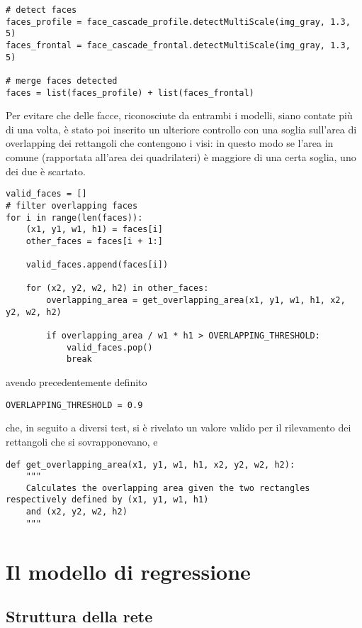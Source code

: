 \begin{verbatim}
# detect faces
faces_profile = face_cascade_profile.detectMultiScale(img_gray, 1.3, 5)
faces_frontal = face_cascade_frontal.detectMultiScale(img_gray, 1.3, 5)

# merge faces detected
faces = list(faces_profile) + list(faces_frontal)
\end{verbatim} 

Per evitare che delle facce, riconosciute da entrambi i modelli, siano contate più di una volta, è stato poi
inserito un ulteriore controllo con una soglia sull'area di overlapping dei rettangoli che contengono i visi:
in questo modo se l'area in comune (rapportata all'area dei quadrilateri) è maggiore di una certa 
soglia, uno dei due è scartato.

\begin{verbatim}
valid_faces = []
# filter overlapping faces
for i in range(len(faces)):
    (x1, y1, w1, h1) = faces[i]
    other_faces = faces[i + 1:]

    valid_faces.append(faces[i])

    for (x2, y2, w2, h2) in other_faces:
        overlapping_area = get_overlapping_area(x1, y1, w1, h1, x2, y2, w2, h2)

        if overlapping_area / w1 * h1 > OVERLAPPING_THRESHOLD:
            valid_faces.pop()
            break
\end{verbatim}
\noindent
avendo precedentemente definito

\begin{verbatim}
OVERLAPPING_THRESHOLD = 0.9
\end{verbatim} 

\noindent
che, in seguito a diversi test, si è rivelato un valore valido per il rilevamento 
dei rettangoli che si sovrapponevano, e

\begin{verbatim}
def get_overlapping_area(x1, y1, w1, h1, x2, y2, w2, h2):
    """
    Calculates the overlapping area given the two rectangles respectively defined by (x1, y1, w1, h1)
    and (x2, y2, w2, h2)
    """
\end{verbatim} 

\section{Il modello di regressione}
\label{section:methods_ml}

\subsection{Struttura della rete}
\label{section:methods_ml_structure}

